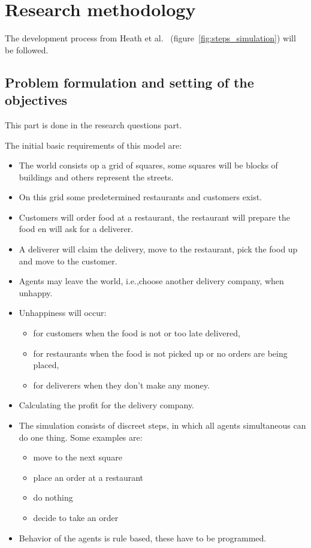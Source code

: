 \section{Research methodology}

The development process from Heath et al.~\cite{heath2009survey} (figure~\ref{fig:steps_simulation}) will be followed.

\subsection{Problem formulation and setting of the objectives}
This part is done in the research questions part.





The initial basic requirements of this model are:

\begin{itemize}
    \item   The world consists op a grid of squares, some squares will be blocks of buildings and others represent the streets.
    \item   On this grid some predetermined restaurants and customers exist.
    \item   Customers will order food at a restaurant, the restaurant will prepare the food en will ask for a deliverer.
    \item   A deliverer will claim the delivery, move to the restaurant, pick the food up and move to the customer.
    \item   Agents may leave the world, i.e.,choose another delivery company, when unhappy.
    \item   Unhappiness will occur:
    \begin{itemize}
        \item   for customers when the food is not or too late delivered,
        \item   for restaurants when the food is not picked up or no orders are being placed,
        \item   for deliverers when they don't make any money.
    \end{itemize}
    \item    Calculating the profit for the delivery company.
    \item    The simulation consists of discreet steps, in which all agents simultaneous can do one thing.
    Some examples are:
    \begin{itemize}
        \item  move to the next square
        \item  place an order at a restaurant
        \item  do nothing
        \item  decide to take an order
    \end{itemize}
    \item   Behavior of the agents is rule based, these have to be programmed.
\end{itemize}

